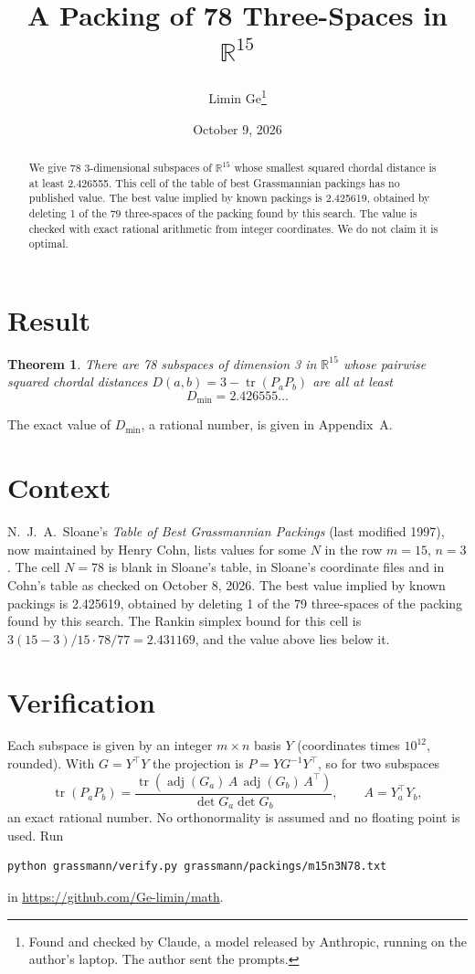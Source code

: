 \documentclass[11pt,a4paper]{article}
\title{A Packing of 78 Three-Spaces in $\mathbb{R}^{15}$}
\author{Limin Ge\thanks{Found and checked by Claude, a model released by Anthropic, running on the author's laptop. The author sent the prompts.}}
\date{October 9, 2026}
\newtheorem*{theorem}{Theorem}
\begin{document}
\maketitle
\begin{abstract}
We give 78 3-dimensional subspaces of $\mathbb{R}^{15}$ whose smallest squared chordal distance is at least 2.426555. This cell of the table of best Grassmannian packings has no published value. The best value implied by known packings is 2.425619, obtained by deleting 1 of the 79 three-spaces of the packing found by this search. The value is checked with exact rational arithmetic from integer coordinates. We do not claim it is optimal.
\end{abstract}

\section{Result}
\begin{theorem}
There are 78 subspaces of dimension 3 in $\mathbb{R}^{15}$ whose pairwise squared chordal distances $D(a,b) = 3 - \operatorname{tr}(P_aP_b)$ are all at least
\[ D_{\min} = 2.426555\ldots \]
\end{theorem}
The exact value of $D_{\min}$, a rational number, is given in Appendix~A.


\section{Context}
N.~J.~A.~Sloane's \emph{Table of Best Grassmannian Packings} (last modified 1997), now maintained by Henry Cohn, lists values for some $N$ in the row $m=15$, $n=3$. The cell $N=78$ is blank in Sloane's table, in Sloane's coordinate files and in Cohn's table as checked on October 8, 2026. The best value implied by known packings is 2.425619, obtained by deleting 1 of the 79 three-spaces of the packing found by this search. The Rankin simplex bound for this cell is $3(15-3)/15\cdot 78/77 = 2.431169$, and the value above lies below it.


\section{Verification}
Each subspace is given by an integer $m\times n$ basis $Y$ (coordinates times $10^{12}$, rounded). With $G=Y^\top Y$ the projection is $P=YG^{-1}Y^\top$, so for two subspaces
\[ \operatorname{tr}(P_aP_b)=\frac{\operatorname{tr}(\operatorname{adj}(G_a)\,A\,\operatorname{adj}(G_b)\,A^\top)}{\det G_a\det G_b},\qquad A=Y_a^\top Y_b, \]
an exact rational number. No orthonormality is assumed and no floating point is used. Run
\begin{verbatim}
python grassmann/verify.py grassmann/packings/m15n3N78.txt
\end{verbatim}
in \url{https://github.com/Ge-limin/math}.
\end{document}
